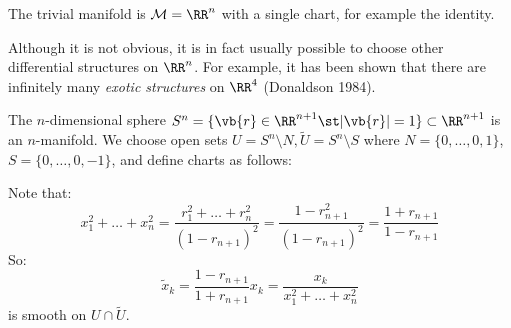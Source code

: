 \documentclass{jknotes}
\begin{document}
\begin{eg}
    The trivial manifold is \(\mathcal{M} = \RR^n\) with a single chart, for example the identity.
\end{eg}
Although it is not obvious, it is in fact usually possible to choose other differential structures on \(\RR^n\). For example, it has been shown that there are infinitely many \emph{exotic structures} on \(\RR^4\) (Donaldson 1984).
\begin{eg}
    The \(n\)-dimensional sphere \(S^n=\{\vb{r}\in\RR^{n+1}\st |\vb{r}|=1\}\subset \RR^{n+1}\) is an \(n\)-manifold. We choose open sets \(U = S^n \setminus N, \tilde{U} = S^n \setminus S\) where \(N = \{0,\dots,0,1\}\), \(S = \{0,\dots,0,-1\}\), and define charts as follows:
    \begin{figure}[H]
        \centering
    \end{figure}
    Note that:
    \begin{equation}
        x_1^2+\dots+x_n^2 = \frac{r_1^2+\dots+r_n^2}{(1-r_{n+1})^2} = \frac{1 - r_{n+1}^2}{(1-r_{n+1})^2} = \frac{1 + r_{n+1}}{1-r_{n+1}}
    \end{equation}
    So:
    \begin{equation}
        \tilde{x}_k = \frac{1-r_{n+1}}{1+r_{n+1}} x_k = \frac{x_k}{x_1^2+\dots+x_n^2}
    \end{equation}
    is smooth on \(U\cap \tilde{U}\).
\end{eg}
\end{document}
